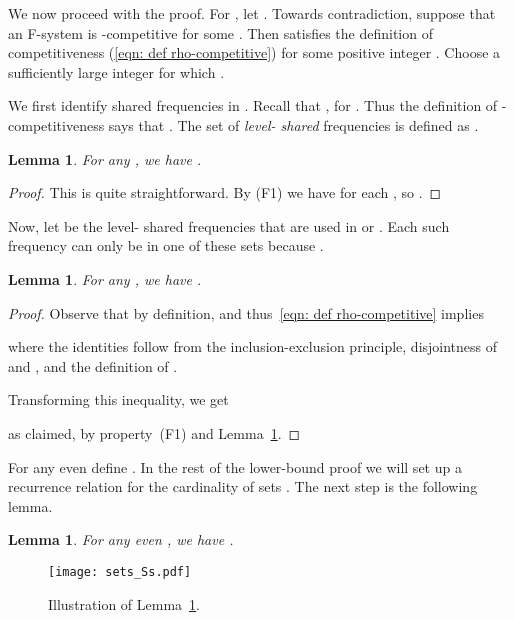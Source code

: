 \documentclass[11pt]{article}
\newtheorem{lemma}[theorem]{Lemma}
\begin{document}
We now proceed with the proof.  For , let . Towards
contradiction, suppose that an F-system  is -competitive for
some . Then  satisfies the definition of
competitiveness (\ref{eqn: def rho-competitive}) for some positive
integer . Choose a sufficiently large integer  for
which .

We first identify shared frequencies in . Recall that 
,  for .
Thus the definition of -competitiveness says that
. The set of \emph{level- shared} 
frequencies is defined as .



\begin{lemma}\label{lem: shared lower bound}
For any , we have .
\end{lemma}

\begin{proof}
This is quite straightforward.  By (F1) we have
 for each , so
.
\end{proof}

Now, let 
 be the level- shared frequencies
that are used in  or .
Each such frequency can only be in one of these sets because 
.



\begin{lemma}\label{lem: S_{2t,t} lower bound}
For any , we have .
\end{lemma}

\begin{proof}
Observe that 
by definition, and thus~\eqref{eqn: def rho-competitive} implies

where the identities follow from the inclusion-exclusion principle, disjointness of
 and , and the definition of . 

Transforming this inequality, we get 

as claimed, by property~(F1) and Lemma~\ref{lem: shared lower bound}.
\end{proof}

For any even  define .
In the rest of the lower-bound proof we will set up a recurrence
relation for
the cardinality of sets . The next step
is the following lemma.



\begin{lemma}\label{lem: subsets of S_2t - Z_2t}
For any even , we have
.
\end{lemma}


\begin{figure}[t]
\begin{center}
\texttt{[image: sets\_Ss.pdf]}
\caption{Illustration of Lemma~\ref{lem: subsets of S_2t - Z_2t}.}
\label{fig: subsets of S_2t - Z_2t}
\end{center}
\end{figure}
\end{document}

